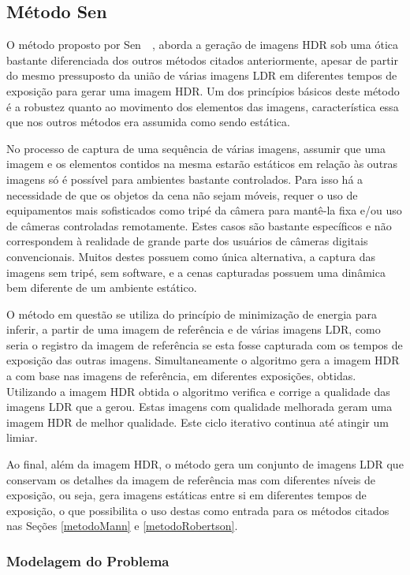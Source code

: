 \subsection{Método Sen} \label{metodoSen}

O método proposto por Sen~\etal~\cite{hdrMovimento}, aborda a geração de imagens HDR sob uma ótica bastante diferenciada dos outros métodos citados anteriormente, apesar de partir do mesmo pressuposto da união de várias imagens LDR em diferentes tempos de exposição para gerar uma imagem HDR. Um dos princípios básicos deste método é a robustez quanto ao movimento dos elementos das imagens, característica essa que nos outros métodos era assumida como sendo estática.

No processo de captura de uma sequência de várias imagens, assumir que uma imagem e os elementos contidos na mesma estarão estáticos em relação às outras imagens só é possível para ambientes bastante controlados. Para isso há a necessidade de que os objetos da cena não sejam móveis, requer o uso de equipamentos mais sofisticados como tripé da câmera para mantê-la fixa e/ou uso de câmeras controladas remotamente. Estes casos são bastante específicos e não correspondem à realidade de grande parte dos usuários de câmeras digitais convencionais. Muitos destes possuem como única alternativa, a captura das imagens sem tripé, sem software, e a cenas capturadas possuem uma dinâmica bem diferente de um ambiente estático.

O método em questão se utiliza do princípio de minimização de energia para inferir, a partir de uma imagem de referência e de várias imagens LDR, como seria o registro da imagem de referência se esta fosse capturada com os tempos de exposição das outras imagens. Simultaneamente o algoritmo gera a imagem HDR a com base nas imagens de referência, em diferentes exposições, obtidas. Utilizando a imagem HDR obtida o algoritmo verifica e corrige a qualidade das imagens LDR que a gerou. Estas imagens com qualidade melhorada geram uma imagem HDR de melhor qualidade. Este ciclo iterativo continua até atingir um limiar.

Ao final, além da imagem HDR, o método gera um conjunto de imagens LDR que conservam os detalhes da imagem de referência mas com diferentes níveis de exposição, ou seja, gera imagens estáticas entre si em diferentes tempos de exposição, o que possibilita o uso destas como entrada para os métodos citados nas Seções \ref{metodoMann} e \ref{metodoRobertson}.

\subsubsection{Modelagem do Problema} \label{MetodoSenModelo}

